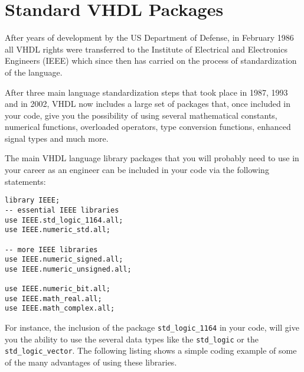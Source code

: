 \null\newpage
\thispagestyle{empty}
\mbox{}

\chapter{Standard VHDL Packages}
After years of development by the US Department of Defense, in February 1986 all VHDL rights were transferred to the Institute of Electrical and Electronics Engineers (IEEE) which since then has carried on the process of standardization of the language.

After three main language standardization steps that took place in 1987, 1993 and in 2002, VHDL now includes a large set of packages that, once included in your code, give you the possibility of using several mathematical constants, numerical functions, overloaded operators, type conversion functions, enhanced signal types and much more.

The main VHDL language library packages that you will probably need to use in your career as an engineer can be included in your code via the following statements:

{\scriptsize
\begin{lstlisting}
library IEEE;
-- essential IEEE libraries
use IEEE.std_logic_1164.all;
use IEEE.numeric_std.all;

-- more IEEE libraries
use IEEE.numeric_signed.all;
use IEEE.numeric_unsigned.all;

use IEEE.numeric_bit.all;
use IEEE.math_real.all;
use IEEE.math_complex.all;
\end{lstlisting}
}

For instance, the inclusion of the package \texttt{std\_logic\_1164} in your code, will give you the ability to use the several data types like the \texttt{std\_logic} or the \texttt{std\_logic\_vector}. The following listing shows a simple coding example of some of the many advantages of using these libraries.

